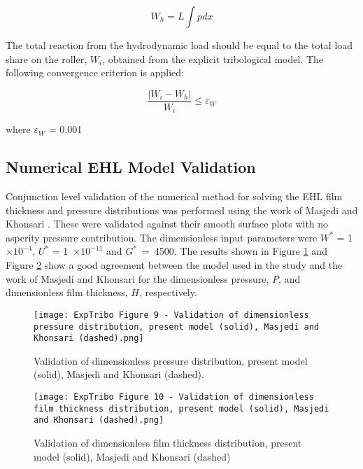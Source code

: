 \begin{enumerate}
	\begin{equation}\label{Reaction load integration EHL}
		W_h=L \int p d x
	\end{equation}

	The total reaction from the hydrodynamic load should be equal to the total load share on the roller, $W_i$, obtained from the explicit tribological model. The following convergence criterion is applied:
	
	\begin{equation}
		\frac{\left|W_i-W_h\right|}{W_i} \leq \varepsilon_W
	\end{equation}

	where $\varepsilon_W$ = 0.001 
\end{enumerate}

\subsection{Numerical EHL Model Validation}
Conjunction level validation of the numerical method for solving the EHL film thickness and pressure distributions was performed using the work of Masjedi and Khonsari \cite{Masjedi2012}. These were validated against their smooth surface plots with no asperity pressure contribution. The dimensionless input parameters were $W^*$ = 1~$\times 10^{-4}$, $U^*$ = 1~$\times 10^{-11}$ and $G^*$~=~4500. The results shown in Figure \ref{EHL Pressure Validation Masjedi Khonsari} and Figure \ref{EHL Film Validation Masjedi Khonsari} show a good agreement between the model used in the study and the work of Masjedi and Khonsari for the dimensionless pressure, $P$, and dimensionless film thickness, $H$, respectively.

\begin{figure}
	\centering
	\texttt{[image: ExpTribo Figure 9 - Validation of dimensionless pressure distribution, present model (solid), Masjedi and Khonsari (dashed).png]}
	\caption{Validation of dimensionless pressure distribution, present model (solid), Masjedi and Khonsari (dashed).}
	\label{EHL Pressure Validation Masjedi Khonsari}
\end{figure}

\begin{figure}
	\centering
	\texttt{[image: ExpTribo Figure 10 - Validation of dimensionless film thickness distribution, present model (solid), Masjedi and Khonsari (dashed).png]}
	\caption{Validation of dimensionless film thickness distribution, present model (solid), Masjedi and Khonsari (dashed)}
	\label{EHL Film Validation Masjedi Khonsari}
\end{figure}

